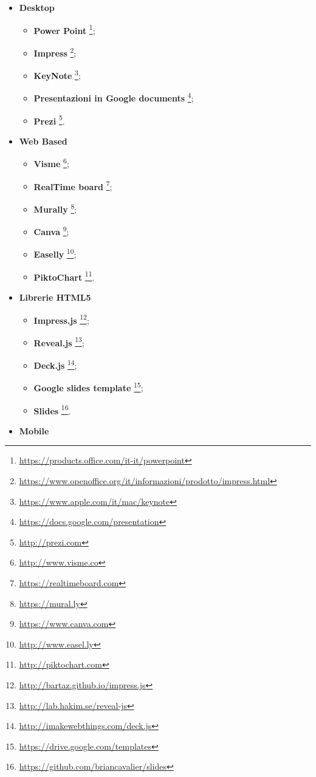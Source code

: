 \begin{itemize}
	\item \textbf{Desktop}
  	\begin{itemize}
  		\item \textbf{Power Point}
  		\footnote{\url{https://products.office.com/it-it/powerpoint}};
  		\item \textbf{Impress}
  		\footnote{\url{https://www.openoffice.org/it/informazioni/prodotto/impress.html}};
  		\item \textbf{KeyNote}
  		\footnote{\url{https://www.apple.com/it/mac/keynote}};
  		\item \textbf{Presentazioni in Google documents}
  		\footnote{\url{https://docs.google.com/presentation}};
  		\item \textbf{Prezi}
  		\footnote{\url{http://prezi.com}}.
  	\end{itemize}
  	\item \textbf{Web Based}
  	\begin{itemize}
  		\item \textbf{Visme}
  		\footnote{\url{http://www.visme.co}};
  		\item \textbf{RealTime board}
  		\footnote{\url{https://realtimeboard.com}};
  		\item \textbf{Murally}
  		\footnote{\url{https://mural.ly}};
  		\item \textbf{Canva}
  		\footnote{\url{https://www.canva.com}};
  		\item \textbf{Easelly}
  		\footnote{\url{http://www.easel.ly}};
  		\item \textbf{PiktoChart}
  		\footnote{\url{http://piktochart.com}}.
  	\end{itemize}
  	  	\item \textbf{Librerie HTML5}
  	\begin{itemize}
  		\item \textbf{Impress.js}
  		\footnote{\url{http://bartaz.github.io/impress.js}};
  		\item \textbf{Reveal.js}
  		\footnote{\url{http://lab.hakim.se/reveal-js}};
  		\item \textbf{Deck.js}
  		\footnote{\url{http://imakewebthings.com/deck.js}};
  		\item \textbf{Google slides template}
  		\footnote{\url{https://drive.google.com/templates}};
  		\item \textbf{Slides}
  		\footnote{\url{https://github.com/briancavalier/slides}}.
  	\end{itemize}
  	  	\item \textbf{Mobile}

\end{itemize}
